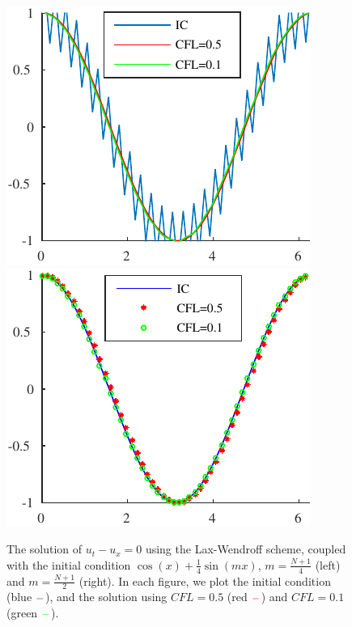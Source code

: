 \documentclass[10pt,a4paper,twoside, french]{article}
\numberwithin{equation}{section}
\numberwithin{figure}{section}
\numberwithin{table}{section}
\begin{document}
\begin{enumerate}
\begin{enumerate}[a.]
\begin{figure}[h!]
\centering
\includegraphics[scale=1]{fig/LAXW_IC1}
\includegraphics[scale=1]{fig/LAXW_IC2}
\caption{The solution of $u_t-u_x=0$ using the Lax-Wendroff scheme, coupled with the initial condition $\cos(x)+\frac{1}{4}\sin(mx)$, $m=\frac{N+1}{4}$ (left) and $m=\frac{N+1}{2}$ (right). In each figure, we plot the initial condition (blue $\color{blue} -$), and the solution using $CFL=0.5$ (red $\color{red} -$) and $CFL=0.1$ (green $\color{green} -$).}
\end{figure}

\end{enumerate}	
\end{enumerate}
	
	
	
	
\end{document}
